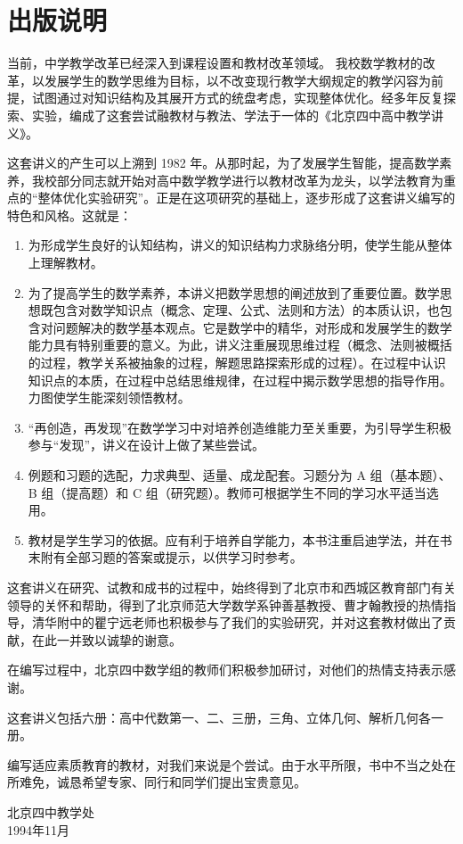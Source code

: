 \chapter{出版说明}

当前，中学教学改革已经深入到课程设置和教材改革领域。
我校数学教材的改革，以发展学生的数学思维为目标，以不改变现行教学大纲规定的教学闪容为前提，试图通过对知识结构及其展开方式的统盘考虑，实现整体优化。经多年反复探索、实验，编成了这套尝试融教材与教法、学法于一体的《北京四中高中教学讲义》。

这套讲义的产生可以上溯到 1982 年。从那时起，为了发展学生智能，提高数学素养，我校部分同志就开始对高中数学教学进行以教材改革为龙头，以学法教育为重点的“整体优化实验研究”。正是在这项研究的基础上，逐步形成了这套讲义编写的特色和风格。这就是：
\begin{enumerate}
    \item 为形成学生良好的认知结构，讲义的知识结构力求脉络分明，使学生能从整体上理解教材。
    \item 为了提高学生的数学素养，本讲义把数学思想的阐述放到了重要位置。数学思想既包含对数学知识点（概念、定理、公式、法则和方法）的本质认识，也包含对问题解决的数学基本观点。它是数学中的精华，对形成和发展学生的数学能力具有特别重要的意义。为此，讲义注重展现思维过程（概念、法则被概括的过程，教学关系被抽象的过程，解题思路探索形成的过程）。在过程中认识知识点的本质，在过程中总结思维规律，在过程中揭示数学思想的指导作用。力图使学生能深刻领悟教材。
    \item “再创造，再发现”在数学学习中对培养创造维能力至关重要，为引导学生积极参与“发现”，讲义在设计上做了某些尝试。
    \item 例题和习题的选配，力求典型、适量、成龙配套。习题分为 A 组（基本题）、 B 组（提高题）和 C 组（研究题）。教师可根据学生不同的学习水平适当选用。
    \item 教材是学生学习的依据。应有利于培养自学能力，本书注重启迪学法，并在书末附有全部习题的答案或提示，以供学习时参考。
 \end{enumerate}   

这套讲义在研究、试教和成书的过程中，始终得到了北京市和西城区教育部门有关领导的关怀和帮助，得到了北京师范大学数学系钟善基教授、曹才翰教授的热情指导，清华附中的瞿宁远老师也积极参与了我们的实验研究，并对这套教材做出了贡献，在此一并致以诚挚的谢意。

在编写过程中，北京四中数学组的教师们积极参加研讨，对他们的热情支持表示感谢。

这套讲义包括六册：高中代数第一、二、三册，三角、立体几何、解析几何各一册。

编写适应素质教育的教材，对我们来说是个尝试。由于水平所限，书中不当之处在所难免，诚恳希望专家、同行和同学们提出宝贵意见。

\begin{flushright}
    北京四中教学处\\
    1994年11月
\end{flushright}